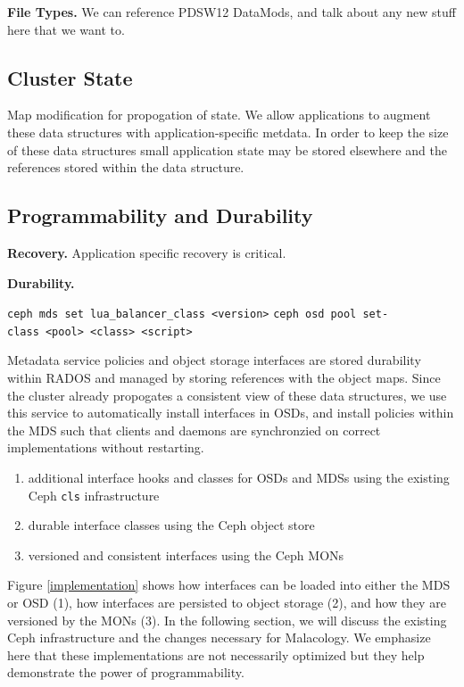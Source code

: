 \documentclass[10pt,twocolumn]{article}
\begin{document}
{\bf File Types.}
We can reference PDSW12 DataMods, and talk about any new stuff here that we
want to.

\subsection{Cluster State}

Map modification for propogation of state. We allow applications to augment
these data structures with application-specific metdata. In order to keep the
size of these data structures small application state may be stored elsewhere
and the references stored within the data structure.

\subsection{Programmability and Durability}

{\bf Recovery.}
Application specific recovery is critical.

{\bf Durability.}

\noindent \texttt{ceph\ mds\ set\ lua\_balancer\_class\ \textless{}version\textgreater{}}
\noindent \texttt{ceph\ osd\ pool\ set-class\ \textless{}pool\textgreater{}\ \textless{}class\textgreater{}\ \textless{}script\textgreater{}}

Metadata service policies and object storage interfaces are stored durability
within RADOS and managed by storing references with the object maps. Since
the cluster already propogates a consistent view of these data structures,
we use this service to automatically install interfaces in OSDs, and install
policies within the MDS such that clients and daemons are synchronzied on
correct implementations without restarting.

\iffalse
\begin{enumerate}
\def\labelenumi{\arabic{enumi}.}
\item
  additional interface hooks and classes for OSDs and MDSs using the
  existing Ceph \texttt{cls} infrastructure
\item
  durable interface classes using the Ceph object store
\item
  versioned and consistent interfaces using the Ceph MONs
\end{enumerate}

Figure \ref{implementation} shows how interfaces can be loaded into
either the MDS or OSD (1), how interfaces are persisted to object
storage (2), and how they are versioned by the MONs (3). In the
following section, we will discuss the existing Ceph infrastructure and
the changes necessary for Malacology. We emphasize here that these
implementations are not necessarily optimized but they help demonstrate
the power of programmability.
\end{document}

